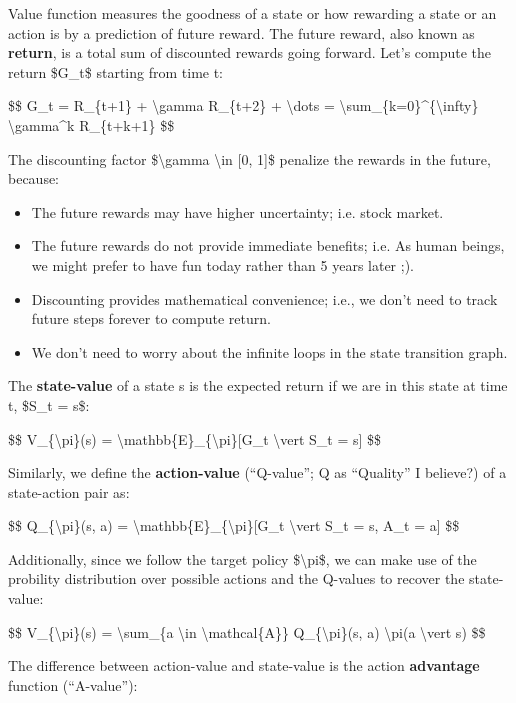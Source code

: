 Value function measures the goodness of a state or how rewarding a state or an action is by a prediction of future reward. The future reward, also known as \textbf{return}, is a total sum of discounted rewards going forward. Let's compute the return \$G\_t\$ starting from time t:

\$\$ G\_t = R\_\{t+1\} + \textbackslash gamma R\_\{t+2\} + \textbackslash dots = \textbackslash sum\_\{k=0\}\^{}\{\textbackslash infty\} \textbackslash gamma\^{}k R\_\{t+k+1\} \$\$

The discounting factor \$\textbackslash gamma \textbackslash in {[}0, 1{]}\$ penalize the rewards in the future, because:

\begin{itemize}
\tightlist
\item
  The future rewards may have higher uncertainty; i.e. stock market.
\item
  The future rewards do not provide immediate benefits; i.e. As human beings, we might prefer to have fun today rather than 5 years later ;).
\item
  Discounting provides mathematical convenience; i.e., we don't need to track future steps forever to compute return.
\item
  We don't need to worry about the infinite loops in the state transition graph.
\end{itemize}

The \textbf{state-value} of a state s is the expected return if we are in this state at time t, \$S\_t = s\$:

\$\$ V\_\{\textbackslash pi\}(s) = \textbackslash mathbb\{E\}\_\{\textbackslash pi\}{[}G\_t \textbackslash vert S\_t = s{]} \$\$

Similarly, we define the \textbf{action-value} (``Q-value''; Q as ``Quality'' I believe?) of a state-action pair as:

\$\$ Q\_\{\textbackslash pi\}(s, a) = \textbackslash mathbb\{E\}\_\{\textbackslash pi\}{[}G\_t \textbackslash vert S\_t = s, A\_t = a{]} \$\$

Additionally, since we follow the target policy \$\textbackslash pi\$, we can make use of the probility distribution over possible actions and the Q-values to recover the state-value:

\$\$ V\_\{\textbackslash pi\}(s) = \textbackslash sum\_\{a \textbackslash in \textbackslash mathcal\{A\}\} Q\_\{\textbackslash pi\}(s, a) \textbackslash pi(a \textbackslash vert s) \$\$

The difference between action-value and state-value is the action \textbf{advantage} function (``A-value''):

